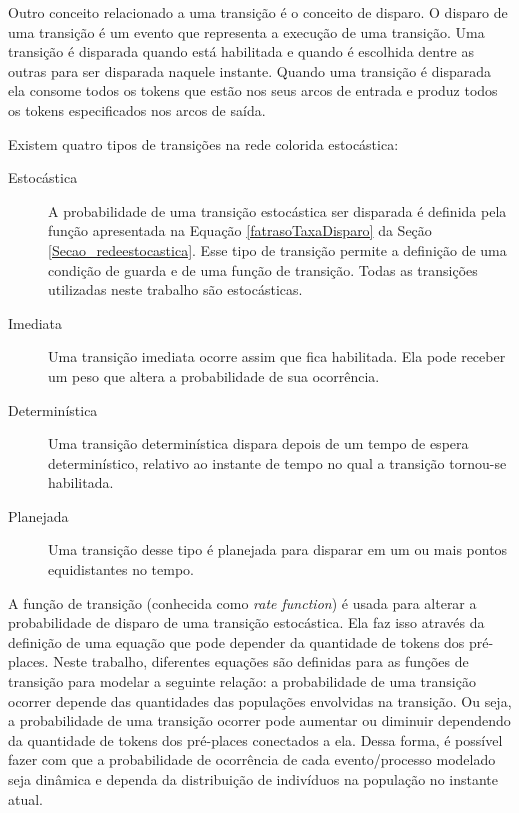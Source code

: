 \documentclass[a4paper,10pt]{article}
\begin{document}
			Outro conceito relacionado a uma transição é o conceito de disparo. 
			O disparo de uma transição é um evento que representa a execução de uma transição. 
			Uma transição é disparada quando está habilitada e quando é escolhida dentre as outras para ser disparada naquele instante. 			
			Quando uma transição é disparada ela consome todos os tokens que estão nos seus arcos de entrada e 
			produz todos os tokens especificados nos arcos de saída. 			
			
			Existem quatro tipos de transições na rede colorida estocástica: 			
			\begin{description}
				\item [Estocástica] A probabilidade de uma transição estocástica ser disparada é 
				definida pela função apresentada na Equação \ref{fatrasoTaxaDisparo} da Seção \ref{Secao_redeestocastica}.
				Esse tipo de transição permite a definição de uma condição de guarda e de uma 
				função de transição. 
				Todas as transições utilizadas neste trabalho são estocásticas. 
				\item [Imediata] Uma transição imediata ocorre assim que fica habilitada.  
				Ela pode receber um peso que altera a probabilidade de sua ocorrência. 
				\item [Determinística] Uma transição determinística dispara depois de um tempo de 
				espera determinístico, relativo ao instante de tempo no qual a transição tornou-se habilitada. 
				\item [Planejada] Uma transição desse tipo é planejada para disparar em um ou mais pontos 
				equidistantes no tempo.
			\end{description}
								
			A função de transição (conhecida como \textit{rate function}) é usada para alterar a probabilidade de disparo de uma transição estocástica. 				
			Ela faz isso através da definição de uma equação que pode depender da quantidade de tokens 
			dos pré-places. Neste trabalho, diferentes equações são definidas para as funções de transição 
			para modelar a seguinte relação: a probabilidade de uma transição ocorrer depende das quantidades 
			das populações envolvidas na transição. Ou seja, a probabilidade de uma transição ocorrer pode aumentar ou diminuir 
			dependendo da quantidade de tokens dos pré-places conectados a ela. Dessa forma, é possível fazer 
			com que a probabilidade de ocorrência de cada evento/processo modelado seja dinâmica e 
			dependa da distribuição de indivíduos na população no instante atual. 
			
\end{document}
